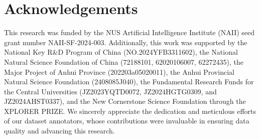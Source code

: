 \section{Acknowledgements}

This research was funded by the NUS Artificial Intelligence Institute (NAII) seed grant number NAII-SF-2024-003. Additionally, this work was supported by the National Key R\&D Program of China (NO.2024YFB3311602),  the National Natural Science Foundation of China (72188101, 62020106007, 62272435), the Major Project of Anhui Province (202203a05020011), the Anhui Provincial Natural Science Foundation (2408085J040), the Fundamental Research Funds for the Central Universities (JZ2023YQTD0072, JZ2024HGTG0309, and JZ2024AHST0337), and the New Cornerstone Science Foundation through the XPLORER PRIZE. We sincerely appreciate the dedication and meticulous efforts of our dataset annotators, whose contributions were invaluable in ensuring data quality and advancing this research.

